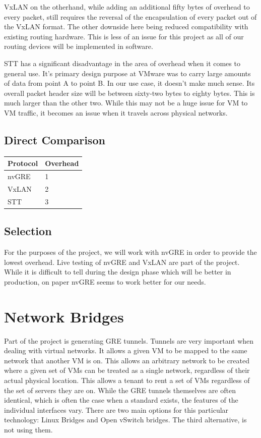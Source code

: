 \documentclass[10pt,letterpaper,onecolumn,draftclsnofoot]{IEEEtran}
\begin{document}
VxLAN on the otherhand, while adding an additional fifty bytes of overhead to
every packet, still requires the reversal of the encapsulation of every packet
out of the VxLAN format. The other downside here being reduced compatibility
with existing routing hardware. This is less of an issue for this project as all
of our routing devices will be implemented in software.\cite{nvgre-vs-vxlan}

STT has a significant disadvantage in the area of overhead when it comes to
general use. It's primary design purpose at VMware was to carry large amounts of
data from point A to point B. In our use case, it doesn't make much sense. Its
overall packet header size will be between sixty-two bytes to eighty bytes. This
is much larger than the other two. While this may not be a huge issue for VM to
VM traffic, it becomes an issue when it travels across physical networks.
\cite{stt}

\subsection{Direct Comparison}
\begin{center}
	\begin{tabular}{| l | l |}
		\hline
		Protocol & Overhead \\ \hline
		nvGRE & 1 \\ \hline
		VxLAN & 2 \\ \hline
		STT & 3 \\ \hline
	\end{tabular}
\end{center}

\subsection{Selection}
For the purposes of the project, we will work with nvGRE in order to provide the
lowest overhead. Live testing of nvGRE and VxLAN are part of the project. While
it is difficult to tell during the design phase which will be better in
production, on paper nvGRE seems to work better for our needs.


\section{Network Bridges}
Part of the project is generating GRE tunnels. Tunnels are very important when
dealing with virtual networks. It allows a given VM to be mapped to the same
network that another VM is on. This allows an arbitrary network to be created
where a given set of VMs can be treated as a single network, regardless of their
actual physical location. This allows a tenant to rent a set of VMs regardless
of the set of servers they are on. While the GRE tunnels themselves are often
identical, which is often the case when a standard exists, the features of the
individual interfaces vary. There are two main options for this particular
technology: Linux Bridges and Open vSwitch bridges. The third alternative, is
not using them.
\end{document}
